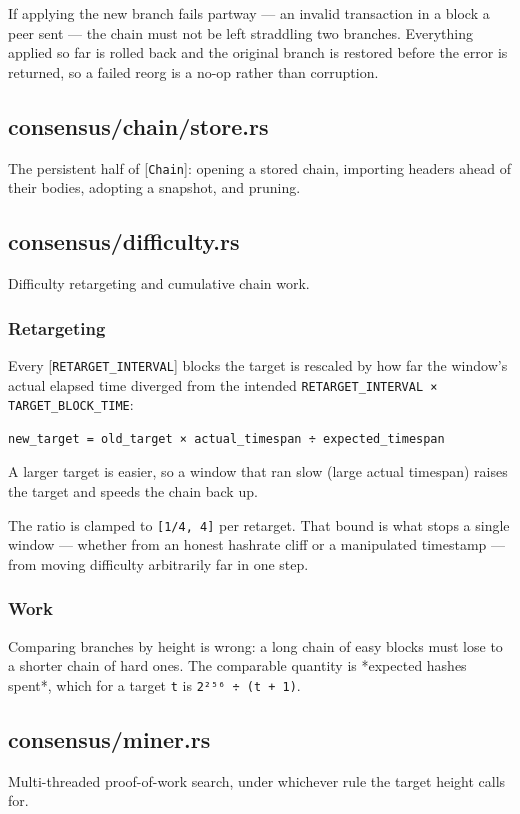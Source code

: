 \documentclass[11pt,a4paper]{article}
\begin{document}
If applying the new branch fails partway — an invalid transaction in a block
a peer sent — the chain must not be left straddling two branches. Everything
applied so far is rolled back and the original branch is restored before the
error is returned, so a failed reorg is a no-op rather than corruption.

\subsection{consensus/chain/store.rs}
The persistent half of [\texttt{Chain}]: opening a stored chain, importing headers
ahead of their bodies, adopting a snapshot, and pruning.

\subsection{consensus/difficulty.rs}
Difficulty retargeting and cumulative chain work.

\subsubsection{Retargeting}

Every [\texttt{RETARGET\_INTERVAL}] blocks the target is rescaled by how far the
window's actual elapsed time diverged from the intended
\texttt{RETARGET\_INTERVAL × TARGET\_BLOCK\_TIME}:

\begin{verbatim}
new_target = old_target × actual_timespan ÷ expected_timespan
\end{verbatim}

A larger target is easier, so a window that ran slow (large actual timespan)
raises the target and speeds the chain back up.

The ratio is clamped to \texttt{[1/4, 4]} per retarget. That bound is what stops a
single window — whether from an honest hashrate cliff or a manipulated
timestamp — from moving difficulty arbitrarily far in one step.

\subsubsection{Work}

Comparing branches by height is wrong: a long chain of easy blocks must lose
to a shorter chain of hard ones. The comparable quantity is *expected hashes
spent*, which for a target \texttt{t} is \texttt{2²⁵⁶ ÷ (t + 1)}.

\subsection{consensus/miner.rs}
Multi-threaded proof-of-work search, under whichever rule the target height
calls for.
\end{document}
